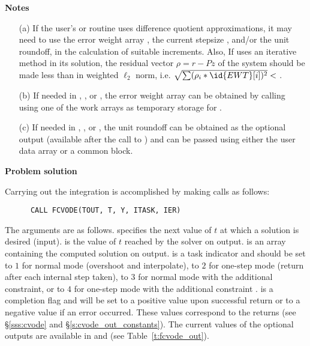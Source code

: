 \begin{Steps}
  {\bf Notes} 
  \begin{itemize}
  \item[(a) ] If the user's  or  routine uses difference
    quotient approximations, it may need to use the error weight array ,
    the current stepsize , and/or the unit roundoff, in the calculation of
    suitable increments.  Also, If  uses an iterative method in its
    solution, the residual vector $\rho = r - Pz$ of the system should be made
    less than  in weighted $\ell_2$ norm, i.e.
    $\sqrt{\sum(\rho_i * \id{EWT}[i])^2} < $ .
  \item[(b) ] If needed in , , or , the
    error weight array  can be obtained by calling 
    using one of the work arrays as temporary storage for .
  \item[(c) ] If needed in , , or , the
    unit roundoff can be obtained as the optional output 
    (available after the call to ) and can be passed
    using either the  user data array or a common block.
  \end{itemize}

\item {\bf Problem solution}

  Carrying out the integration is accomplished by making calls as follows:
\begin{verbatim}
      CALL FCVODE(TOUT, T, Y, ITASK, IER)
\end{verbatim}
  The arguments are as follows.
   specifies the next value of $t$ at which a solution is desired (input).
   is the value of $t$ reached by the solver on output.
   is an array containing the computed solution on output.
   is a task indicator and should be set to $1$ for normal mode 
  (overshoot  and interpolate), to $2$ for one-step mode 
  (return after each internal step taken), to $3$ for normal mode with
  the additional  constraint, or to $4$ for one-step mode 
  with the additional constraint .
   is a completion flag and will be set to a positive value upon
  successful return or to a negative value if an error occurred. These values
  correspond to the  returns (see \S\ref{sss:cvode} and \S\ref{s:cvode_out_constants}).
  The current values of the optional outputs are available in  and
   (see Table~\ref{t:fcvode_out}).
  

\end{Steps}
